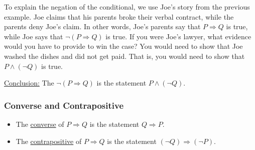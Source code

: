 


To explain the negation of the conditional, we use Joe's story from the previous example. Joe claims that his parents broke their verbal contract, while the parents deny Joe's claim. In other words, Joe's parents say that $P \Rightarrow Q$ is true, while Joe says that $\neg (P \Rightarrow Q)$ is true. If you were Joe's lawyer, what evidence would you have to provide to win the case? You would need to show that Joe washed the dishes and did not get paid. That is, you would need to show that $P \wedge (\neg Q)$ is true.

	\underline{Conclusion:} The $ \neg (P \Rightarrow Q)$ is the statement $P \wedge (\neg Q)$.

\subsubsection*{Converse and Contrapositive}

\begin{definition}
\begin{itemize}
	\item The \underline{converse} of $P \Rightarrow Q$ is the statement $Q \Rightarrow P$. 
	\item The \underline{contrapositive} of $P \Rightarrow Q$ is the statement $(\neg Q) \Rightarrow (\neg P)$.
\end{itemize}
\end{definition}

